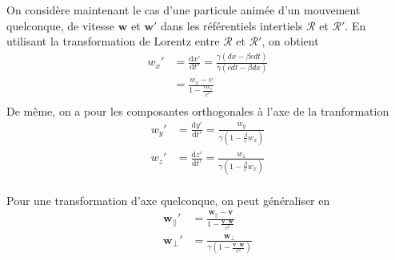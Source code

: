         On considère maintenant le cas d’une particule animée d’un mouvement quelconque, de vitesse $\mathbf{w}$ et $\mathbf{w}'$ dans les référentiels intertiels $\mathcal{R}$ et $\mathcal{R}'$. En utilisant la transformation de Lorentz entre $\mathcal{R}$ et $\mathcal{R}'$, on obtient 
        \begin{align*}
            w_x' 
            &= \frac{\text{d}x'}{\text{d}t'} = \frac{\gamma(dx - \beta c dt)}{\gamma(cdt - \beta dx)} \\
            &= \frac{w_x - v}{1 - \frac{v w_x}{c^2}} \\
        \end{align*}
        De même, on a pour les composantes orthogonales à l’axe de la tranformation 
        \begin{align*}
            w_y' &= \frac{\text{d}y'}{\text{d}t'} = \frac{w_y}{\gamma\left(1 - \frac{\beta}{c} w_x\right)} \\
            w_z' &= \frac{\text{d}z'}{\text{d}t'} = \frac{w_z}{\gamma\left(1 - \frac{\beta}{c} w_x\right)} \\
        \end{align*}

        Pour une transformation d’axe quelconque, on peut généraliser en 
        \begin{align*}
            \mathbf{w}_{||}' &= \frac{\mathbf{w}_{||} - \mathbf{v}}{1 - \frac{\mathbf{v} \cdot \mathbf{w}}{c^2}} \\
            \mathbf{w}_{\perp}' &= \frac{\mathbf{w}_{\perp}}{\gamma(1 - \frac{\mathbf{v} \cdot \mathbf{w}}{c^2})} \\
        \end{align*}


    

        